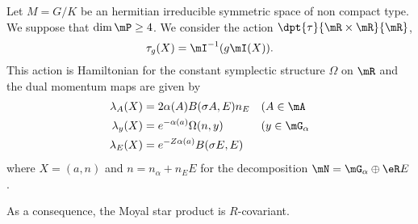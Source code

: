 \begin{proposition}
	Let $M=G/K$ be an hermitian irreducible symmetric space of non compact type. We suppose that $\dim\mP\geq 4$. We consider the action $\dpt{ \tau }{  \mR\times\mR  }{ \mR }$,
	\[
		\tau_g(X)=\mI^{-1}(g\mI(X)).
	\]
	This action is Hamiltonian for the constant symplectic structure $\Omega$ on $\mR$ and the dual momentum maps are given by
	\begin{subequations}
		\begin{align}
			\lambda_A(X) & =2\alpha(A)B(\sigma A,E)n_E    &  & \text{(}A\in \mA         \\
			\lambda_y(X) & = e^{-\alpha(a)}\Omega(n,y)    &  & \text{(}y\in\mG_{\alpha} \\
			\lambda_E(X) & = e^{-Z\alpha(a)}B(\sigma E,E)
		\end{align}
	\end{subequations}
	where $X=(a,n)$ and $n=n_{\alpha}+n_EE$ for the decomposition $\mN=\mG_{\alpha}\oplus\eR E$.

	As a consequence, the Moyal star product is $R$-covariant.

\end{proposition}

